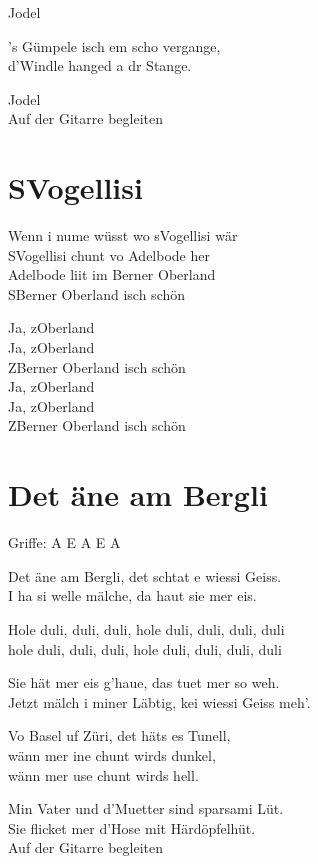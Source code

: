 \documentclass[
  letterpaper,
  twoside=false]{scrbook}
\begin{document}
Jodel

's Gümpele isch em scho vergange,\\
d'Windle hanged a dr Stange.

Jodel\\
Auf der Gitarre begleiten

\hypertarget{svogellisi}{%
\chapter{S\textquotesingle Vogellisi}\label{svogellisi}}

Wenn i nume wüsst wo s\textquotesingle Vogellisi wär\\
S\textquotesingle Vogellisi chunt vo Adelbode her\\
Adelbode liit im Berner Oberland\\
S\textquotesingle Berner Oberland isch schön

Ja, z\textquotesingle Oberland\\
Ja, z\textquotesingle Oberland\\
Z\textquotesingle Berner Oberland isch schön\\
Ja, z\textquotesingle Oberland\\
Ja, z\textquotesingle Oberland\\
Z\textquotesingle Berner Oberland isch schön

\hypertarget{det-uxe4ne-am-bergli}{%
\chapter{Det äne am Bergli}\label{det-uxe4ne-am-bergli}}

Griffe: A E A E A

Det äne am Bergli, det schtat e wiessi Geiss.\\
I ha si welle mälche, da haut sie mer eis.

Hole duli, duli, duli, hole duli, duli, duli, duli\\
hole duli, duli, duli, hole duli, duli, duli, duli

Sie hät mer eis g'haue, das tuet mer so weh.\\
Jetzt mälch i miner Läbtig, kei wiessi Geiss meh'.

Vo Basel uf Züri, det häts es Tunell,\\
wänn mer ine chunt wirds dunkel,\\
wänn mer use chunt wirds hell.

Min Vater und d'Muetter sind sparsami Lüt.\\
Sie flicket mer d'Hose mit Härdöpfelhüt.\\
Auf der Gitarre begleiten


\backmatter
\end{document}
